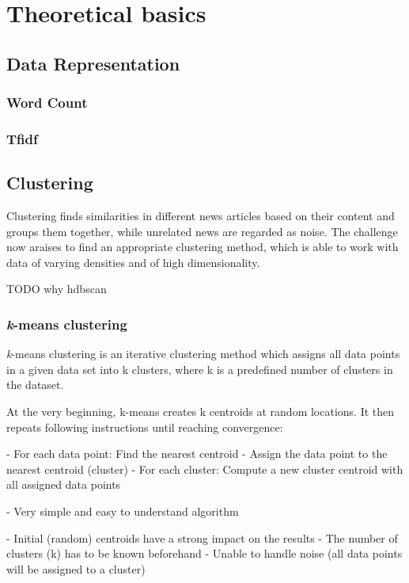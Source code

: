 \section{Theoretical basics}

\subsection{Data Representation}

\subsubsection{Word Count}

\subsubsection{Tfidf}

\subsection{Clustering}
Clustering finds similarities in different news articles based on their content and groups them together, while unrelated news are regarded as noise. The challenge now araises to find an appropriate clustering method, which is able to work with data of varying densities and of high dimensionality.

TODO why hdbscan

\subsubsection{\textit{k}-means clustering}
\textit{k}-means clustering is an iterative clustering method which assigns all data points in a given data set
into k clusters, where k is a predefined number of clusters in the dataset.

At the very beginning, k-means creates k centroids at random locations.
It then repeats following instructions until reaching convergence:

- For each data point: Find the nearest centroid
- Assign the data point to the nearest centroid (cluster)
- For each cluster: Compute a new cluster centroid with all assigned data points

- Very simple and easy to understand algorithm

- Initial (random) centroids have a strong impact on the results
- The number of clusters (k) has to be known beforehand
- Unable to handle noise (all data points will be assigned to a cluster)

